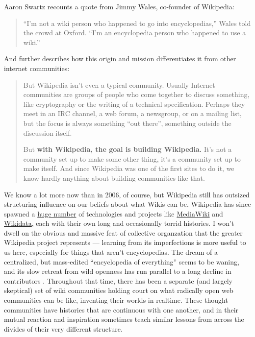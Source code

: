 \documentclass[10pt]{tufte-book}
\begin{document}
Aaron Swartz recounts a quote from Jimmy Wales, co-founder of Wikipedia:

\begin{quote}
``I'm not a wiki person who happened to go into encyclopedias,'' Wales
told the crowd at Oxford. ``I'm an encyclopedia person who happened to
use a wiki.'' \citep{swartzWhoWritesWikipedia2006} 
\end{quote}

And further describes how this origin and mission differentiates it from
other internet communities:

\begin{quote}
But Wikipedia isn't even a typical community. Usually Internet
communities are groups of people who come together to discuss something,
like cryptography or the writing of a technical specification. Perhaps
they meet in an IRC channel, a web forum, a newsgroup, or on a mailing
list, but the focus is always something ``out there'', something outside
the discussion itself.

But \textbf{with Wikipedia, the goal is building Wikipedia.} It's not a
community set up to make some other thing, it's a community set up to
make itself. And since Wikipedia was one of the first sites to do it, we
know hardly anything about building communities like that. \citep{swartzMakingMoreWikipedias2006} 
\end{quote}

We know a lot more now than in 2006, of course, but Wikipedia still has
outsized structuring influence on our beliefs about what Wikis can be.
Wikipedia has since spawned a
\href{https://meta.wikimedia.org/wiki/Complete_list_of_Wikimedia_projects}{huge
number} of technologies and projects like
\href{https://meta.wikimedia.org/wiki/MediaWiki}{MediaWiki} and
\href{https://meta.wikimedia.org/wiki/Wikidata}{Wikidata}, each with
their own long and occasionally torrid histories. I won't dwell on the
obvious and massive feat of collective organzation that the greater
Wikipedia project represents --- learning from its imperfections is more
useful to us here, especially for things that aren't encyclopedias. The
dream of a centralized, but mass-edited ``encyclopedia of everything''
seems to be waning, and its slow retreat from wild openness has run
parallel to a long decline in contributors \citep{hillWikipediaEndOpen2019, halfakerRiseDeclineOpen2013} . Throughout
that time, there has been a separate (and largely skeptical) set of wiki
communities holding court on what radically open web communities can be
like, inventing their worlds in realtime. These thought communities have
histories that are continuous with one another, and in their mutual
reaction and inspiration sometimes teach similar lessons from across the
divides of their very different structure.
\end{document}

